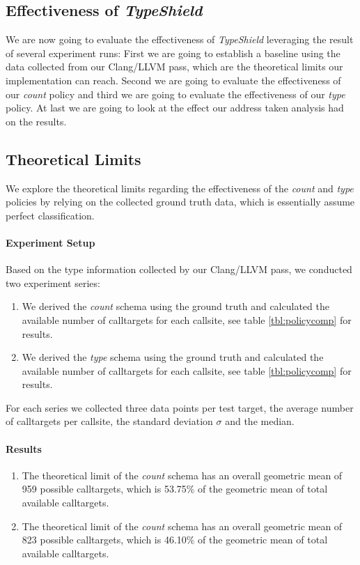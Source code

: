 %
%
%
%
\subsection{Effectiveness of \textit{TypeShield}}
\label{section:typeshieldeffectiveness}
We are now going to evaluate the effectiveness of \textit{TypeShield} leveraging the result of several experiment runs: First we are going to establish a baseline using the data collected from our Clang/LLVM pass, which are the theoretical limits our implementation can reach. Second we are going to evaluate the effectiveness of our \textit{count} policy and third we are going to evaluate the effectiveness of our \textit{type} policy. At last we are going to look at the effect our address taken analysis had on the results.

\subsection{Theoretical Limits}
\label{subsection:theoreticallimit}
We explore the theoretical limits regarding the effectiveness of the \textit{count} and \textit{type} policies by relying on the collected ground truth data, which is essentially assume perfect classification.

\paragraph{Experiment Setup} Based on the type information collected by our Clang/LLVM pass, we conducted two experiment series:
\begin{enumerate}
\item We derived the \textit{count} schema using the ground truth and calculated the available number of calltargets for each callsite, see table \ref{tbl:policycomp} for results.
\item We derived the \textit{type} schema using the ground truth and calculated the available number of calltargets for each callsite, see table \ref{tbl:policycomp} for results.
\end{enumerate}
For each series we collected three data points per test target, the average number of calltargets per callsite, the standard deviation $\sigma$ and the median.

\paragraph{Results}
\begin{enumerate}
\item The theoretical limit of the \textit{count} schema has an overall geometric mean of 959 possible calltargets, which is 53.75\% of the geometric mean of total available calltargets.
\item The theoretical limit of the \textit{count} schema has an overall geometric mean of 823 possible calltargets, which is 46.10\% of the geometric mean of total available calltargets.
\end{enumerate}

